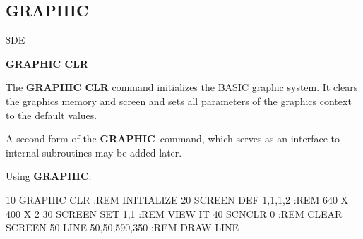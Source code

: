 \subsection{GRAPHIC}
\begin{description}[leftmargin=3cm,style=nextline]
\item [Token:] \$DE
\item [Format:] {\bf GRAPHIC CLR}
\item [Usage:] The {\bf GRAPHIC CLR}
               command initializes the BASIC graphic system.
               It clears the graphics memory and screen and sets
               all parameters of the graphics context to the
               default values.

\item [Remarks:] A second form of the {\bf GRAPHIC} command,
               which serves as an interface to internal
               subroutines may be added later.

\item [Example:] Using {\bf GRAPHIC}:
\begin{screenoutput}
 10 GRAPHIC CLR         :REM INITIALIZE
 20 SCREEN DEF 1,1,1,2  :REM 640 X 400 X 2
 30 SCREEN SET 1,1      :REM VIEW IT
 40 SCNCLR 0            :REM CLEAR SCREEN
 50 LINE 50,50,590,350  :REM DRAW LINE
\end{screenoutput}
\end{description}


\newpage
